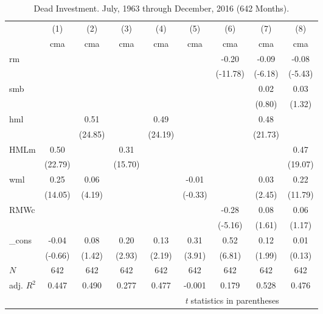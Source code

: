 
\begin{table}[ht]
\centering
\caption{Dead Investment. \footnotesize{July, 1963 through December, 2016 (642 Months).}}
\label{tbl:Inv}
\begin{tabular}{l*{8}{c}}
\hline\hline
          &\multicolumn{1}{c}{(1)}&\multicolumn{1}{c}{(2)}&\multicolumn{1}{c}{(3)}&\multicolumn{1}{c}{(4)}&\multicolumn{1}{c}{(5)}&\multicolumn{1}{c}{(6)}&\multicolumn{1}{c}{(7)}&\multicolumn{1}{c}{(8)}\\
          &\multicolumn{1}{c}{cma}&\multicolumn{1}{c}{cma}&\multicolumn{1}{c}{cma}&\multicolumn{1}{c}{cma}&\multicolumn{1}{c}{cma}&\multicolumn{1}{c}{cma}&\multicolumn{1}{c}{cma}&\multicolumn{1}{c}{cma}\\
\hline
rm        &         &         &         &         &         &    -0.20&    -0.09&    -0.08\\
          &         &         &         &         &         & (-11.78)&  (-6.18)&  (-5.43)\\
[1em]
smb       &         &         &         &         &         &         &     0.02&     0.03\\
          &         &         &         &         &         &         &   (0.80)&   (1.32)\\
[1em]
hml       &         &     0.51&         &     0.49&         &         &     0.48&         \\
          &         &  (24.85)&         &  (24.19)&         &         &  (21.73)&         \\
[1em]
HMLm      &     0.50&         &     0.31&         &         &         &         &     0.47\\
          &  (22.79)&         &  (15.70)&         &         &         &         &  (19.07)\\
[1em]
wml       &     0.25&     0.06&         &         &    -0.01&         &     0.03&     0.22\\
          &  (14.05)&   (4.19)&         &         &  (-0.33)&         &   (2.45)&  (11.79)\\
[1em]
RMWc      &         &         &         &         &         &    -0.28&     0.08&     0.06\\
          &         &         &         &         &         &  (-5.16)&   (1.61)&   (1.17)\\
[1em]
\_cons    &    -0.04&     0.08&     0.20&     0.13&     0.31&     0.52&     0.12&     0.01\\
          &  (-0.66)&   (1.42)&   (2.93)&   (2.19)&   (3.91)&   (6.81)&   (1.99)&   (0.13)\\
\hline
\(N\)     &      642&      642&      642&      642&      642&      642&      642&      642\\
adj. \(R^{2}\)&    0.447&    0.490&    0.277&    0.477&   -0.001&    0.179&    0.528&    0.476\\
\hline\hline
\multicolumn{8}{r}{\footnotesize \textit{t} statistics in parentheses}\\
\end{tabular}
\end{table}

